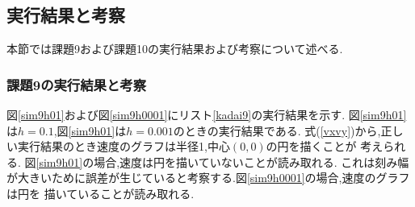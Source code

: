 \documentclass[a4j]{jarticle}
\begin{document}
      \subsection{実行結果と考察}
      本節では課題9および課題10の実行結果および考察について述べる.
      \subsubsection{課題9の実行結果と考察}
      図\ref{sim9h01}および図\ref{sim9h0001}にリスト\ref{kadai9}の実行結果を示す.
      図\ref{sim9h01}は$h=0.1$,図\ref{sim9h01}は$h=0.001$のときの実行結果である.
      式(\ref{vxvy})から,正しい実行結果のとき速度のグラフは半径1,中心$(0,0)$の円を描くことが
      考えられる. 図\ref{sim9h01}の場合,速度は円を描いていないことが読み取れる.
      これは刻み幅が大きいために誤差が生じていると考察する.図\ref{sim9h0001}の場合,速度のグラフは円を
      描いていることが読み取れる.
\end{document}
